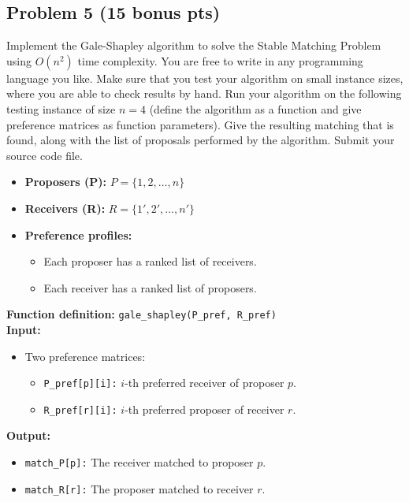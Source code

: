 \documentclass[12pt]{article}
\begin{document}
\subsection*{Problem 5 (15 bonus pts)}

Implement the Gale-Shapley algorithm to solve the Stable Matching Problem using $O(n^2)$ time complexity. You are free to write in any programming language you like. Make sure that you test your algorithm on small instance sizes, where you are able to check results by hand. Run your algorithm on the following testing instance of size $n=4$ (define the algorithm as a function and give preference matrices as function parameters). Give the resulting matching that is found, along with the list of proposals performed by the algorithm. Submit your source code file.

\begin{itemize}
    \item \textbf{Proposers (P):} $P= \{1, 2, \ldots, n\}$
    \item \textbf{Receivers (R):} $R= \{1', 2', \ldots, n'\}$
    \item \textbf{Preference profiles:}
    \begin{itemize}
        \item Each proposer has a ranked list of receivers.
        \item Each receiver has a ranked list of proposers.
    \end{itemize}
\end{itemize}


\textbf{Function definition:} \texttt{gale\_shapley(P\_pref, R\_pref)} \\

\textbf{Input:}
\begin{itemize}
    \item Two preference matrices:
    \begin{itemize}
        \item \texttt{P\_pref[p][i]:} $i$-th preferred receiver of proposer $p$.
        \item \texttt{R\_pref[r][i]:} $i$-th preferred proposer of receiver $r$.
    \end{itemize}
\end{itemize}

\textbf{Output:}
\begin{itemize}
    \item \texttt{match\_P[p]:} The receiver matched to proposer $p$.
    \item \texttt{match\_R[r]:} The proposer matched to receiver $r$.
\end{itemize}
\end{document}
